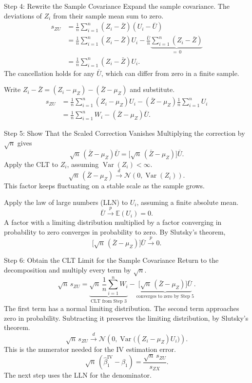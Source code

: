 \documentclass[notes,10pt, aspectratio=169]{beamer}
\begin{document}
\begin{frame}{Step 4: Rewrite the Sample Covariance}
\small
\setlength{\abovedisplayskip}{3pt}
\setlength{\belowdisplayskip}{3pt}
Expand the sample covariance. The deviations of $Z_i$ from their sample mean sum to zero.
\[
\begin{aligned}
s_{ZU}
&=\frac{1}{n}\sum_{i=1}^{n}(Z_i-\bar Z)(U_i-\bar U)\\
&=\frac{1}{n}\sum_{i=1}^{n}(Z_i-\bar Z)U_i
-\frac{\bar U}{n}\underbrace{\sum_{i=1}^{n}(Z_i-\bar Z)}_{=\,0}\\
&=\frac{1}{n}\sum_{i=1}^{n}(Z_i-\bar Z)U_i.
\end{aligned}
\]
The cancellation holds for any $\bar U$, which can differ from zero in a finite sample.

\medskip
Write $Z_i-\bar Z=(Z_i-\mu_Z)-(\bar Z-\mu_Z)$ and substitute.
\[
\begin{aligned}
s_{ZU}
&=\frac{1}{n}\sum_{i=1}^{n}(Z_i-\mu_Z)U_i
  -(\bar Z-\mu_Z)\frac{1}{n}\sum_{i=1}^{n}U_i\\
&=\frac{1}{n}\sum_{i=1}^{n}W_i-(\bar Z-\mu_Z)\bar U.
\end{aligned}
\]
\end{frame}

\begin{frame}{Step 5: Show That the Scaled Correction Vanishes}
Multiplying the correction by $\sqrt n$ gives
\[
\sqrt n\,(\bar Z-\mu_Z)\bar U
=\bigl[\sqrt n\,(\bar Z-\mu_Z)\bigr]\bar U.
\]
Apply the CLT to $Z_i$, assuming $\operatorname{Var}(Z_i)<\infty$.
\[
\sqrt n\,(\bar Z-\mu_Z)
\xrightarrow{d}\mathcal N\!\left(0,\operatorname{Var}(Z_i)\right).
\]
This factor keeps fluctuating on a stable scale as the sample grows.

\medskip
Apply the law of large numbers (LLN) to $U_i$, assuming a finite absolute mean.
\[
\bar U\xrightarrow{p}\mathbb E(U_i)=0.
\]
A factor with a limiting distribution multiplied by a factor converging in probability to zero converges in probability to zero. By Slutsky's theorem,
\[
\bigl[\sqrt n\,(\bar Z-\mu_Z)\bigr]\bar U\xrightarrow{p}0.
\]
\end{frame}

\begin{frame}{Step 6: Obtain the CLT Limit for the Sample Covariance}
Return to the decomposition and multiply every term by $\sqrt n$.
\[
\sqrt n\,s_{ZU}
=\underbrace{\sqrt n\,\frac{1}{n}\sum_{i=1}^{n}W_i}_{\text{CLT from Step 3}}
-\underbrace{\bigl[\sqrt n\,(\bar Z-\mu_Z)\bigr]\bar U}_{\text{converges to zero by Step 5}}.
\]
The first term has a normal limiting distribution. The second term approaches zero in probability. Subtracting it preserves the limiting distribution, by Slutsky's theorem.
\[
\boxed{
\sqrt n\,s_{ZU}\xrightarrow{d}
\mathcal N\!\left(0,\operatorname{Var}\bigl((Z_i-\mu_Z)U_i\bigr)\right).
}
\]
This is the numerator needed for the IV estimation error.
\[
\sqrt n\,(\hat\beta_1^{\mathrm{IV}}-\beta_1)
=\frac{\sqrt n\,s_{ZU}}{s_{ZX}}.
\]
The next step uses the LLN for the denominator.
\end{frame}
\end{document}
